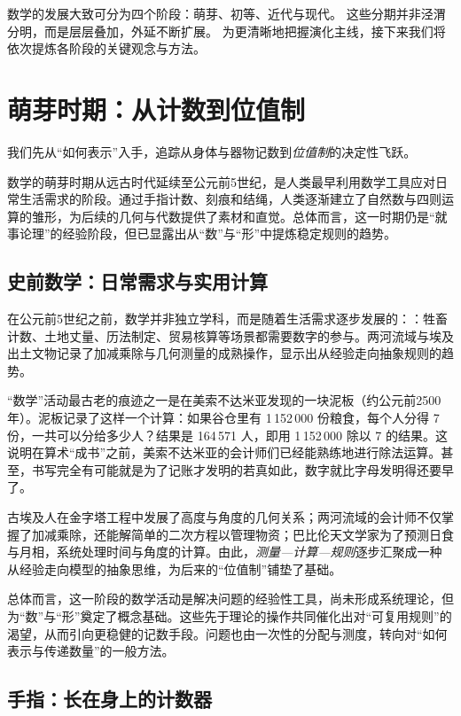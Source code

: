 数学的发展大致可分为四个阶段：萌芽、初等、近代与现代。
这些分期并非泾渭分明，而是层层叠加，外延不断扩展。
为更清晰地把握演化主线，接下来我们将依次提炼各阶段的关键观念与方法。

\section{萌芽时期：从计数到位值制}

我们先从“如何表示”入手，追踪从身体与器物记数到\emph{位值制}的决定性飞跃。

数学的萌芽时期从远古时代延续至公元前5世纪，是人类最早利用数学工具应对日常生活需求的阶段。通过手指计数、刻痕和结绳，人类逐渐建立了自然数与四则运算的雏形，为后续的几何与代数提供了素材和直觉。总体而言，这一时期仍是“就事论理”的经验阶段，但已显露出从“数”与“形”中提炼稳定规则的趋势。

\subsection{史前数学：日常需求与实用计算}

在公元前5世纪之前，数学并非独立学科，而是随着生活需求逐步发展的：：牲畜计数、土地丈量、历法制定、贸易核算等场景都需要数字的参与。两河流域与埃及出土文物记录了加减乘除与几何测量的成熟操作，显示出从经验走向抽象规则的趋势。

“数学”活动最古老的痕迹之一是在美索不达米亚发现的一块泥板（约公元前2500年）。泥板记录了这样一个计算：如果谷仓里有 1\,152\,000 份粮食，每个人分得 7 份，一共可以分给多少人？结果是 164\,571 人，即用 1\,152\,000 除以 7 的结果。这说明在算术“成书”之前，美索不达米亚的会计师们已经能熟练地进行除法运算。甚至，书写完全有可能就是为了记账才发明的若真如此，数字就比字母发明得还要早了。

古埃及人在金字塔工程中发展了高度与角度的几何关系；两河流域的会计师不仅掌握了加减乘除，还能解简单的二次方程以管理物资；巴比伦天文学家为了预测日食与月相，系统处理时间与角度的计算。由此，\emph{测量—计算—规则}逐步汇聚成一种从经验走向模型的抽象思维，为后来的“位值制”铺垫了基础。

总体而言，这一阶段的数学活动是解决问题的经验性工具，尚未形成系统理论，但为“数”与“形”奠定了概念基础。这些先于理论的操作共同催化出对“可复用规则”的渴望，从而引向更稳健的记数手段。问题也由一次性的分配与测度，转向对“如何表示与传递数量”的一般方法。

\subsection{手指：长在身上的计数器}

